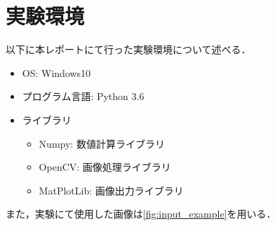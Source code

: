 \section{実験環境}

以下に本レポートにて行った実験環境について述べる．

\begin{itemize}
  \item OS: Windows10
  \item プログラム言語: Python 3.6
  \item ライブラリ
  \begin{itemize}
    \item Numpy: 数値計算ライブラリ
    \item OpenCV: 画像処理ライブラリ
    \item MatPlotLib: 画像出力ライブラリ
  \end{itemize}
\end{itemize}

また，実験にて使用した画像は\autoref{fig:input_example}を用いる．
